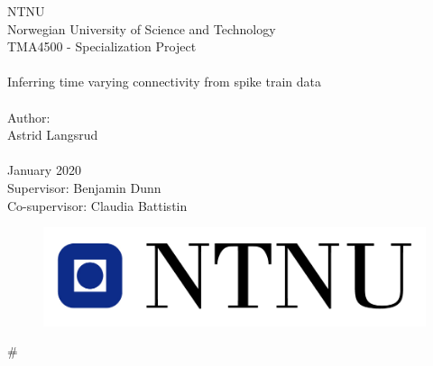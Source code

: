 \documentclass[pdftex,10pt,b5paper,twoside]{book}
\begin{document}
\graphicspath{{fig/}}


\thispagestyle{empty}

\begin{center}

\Large{NTNU}\\
\normalsize{Norwegian University of Science and Technology}\\
[3pc]
\Large{TMA4500 - Specialization Project}\\

\Huge{\hrulefill\\Inferring time varying connectivity from spike train data \\\hrulefill}\\[2pc]
\small{Author:}\\\Large{Astrid Langsrud}\\
\mbox{}\\[3pc]
\large{January 2020}\\[2pc]

\small{Supervisor: Benjamin Dunn}\\
\small{Co-supervisor: Claudia Battistin}

\end{center}
\vfill

\begin{figure}[h]
\centering
\includegraphics[scale=0.5]{fig/ntnu-logo.jpg}
\label{fig:frontpage_logo}
\end{figure}


#		%









\end{document}
